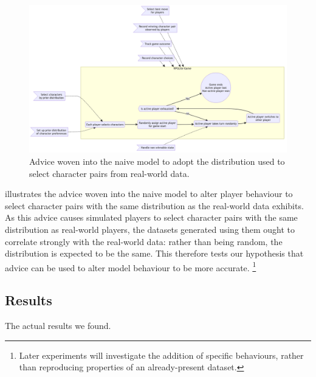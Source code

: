 \begin{figure}[h]
  \centering
  \includegraphics[width=\columnwidth]{70_generality_of_aspects/diagrams/exp2_prior_distribution_model.png}
  \caption{Advice woven into the naive model to adopt the distribution used to select character pairs from real-world data.}
  \label{fig:exp2_prior_distribution_model}
\end{figure}

 illustrates the advice woven into the
naive model to alter player behaviour to select character pairs with the same
distribution as the real-world data exhibits. As this advice causes simulated
players to select character pairs with the same distribution as real-world
players, the datasets generated using them ought to correlate strongly with the
real-world data: rather than being random, the distribution is expected to be
the same. This therefore tests our hypothesis that advice can be used to alter
model behaviour to be more accurate.
\footnote{
  Later experiments will investigate the addition of specific behaviours, rather
  than reproducing properties of an already-present dataset.
}


\subsection{Results}

The actual results we found.



